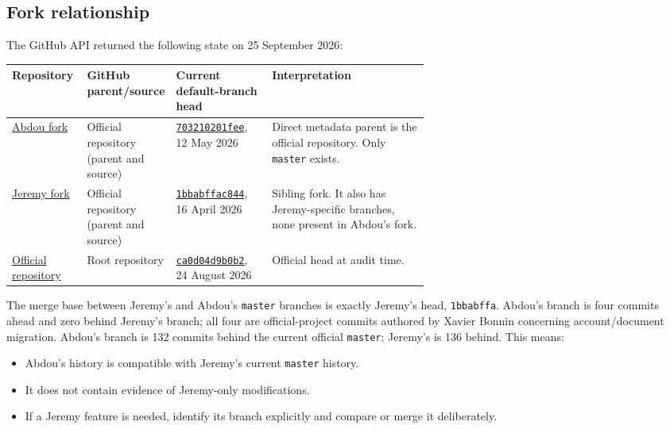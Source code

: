 \documentclass[11pt]{article}
\begin{document}
\subsection{Fork relationship}

The GitHub API returned the following state on 25 September 2026:

\small
\begin{tabularx}{\linewidth}{@{}p{0.18\linewidth}p{0.20\linewidth}p{0.23\linewidth}Y@{}}
\toprule
Repository & GitHub parent/source & Current default-branch head & Interpretation \\
\midrule
\href{https://github.com/abdoudiaw/SOLPS-ITER}{Abdou fork} & Official repository (parent and source) & \href{https://github.com/abdoudiaw/SOLPS-ITER/commit/703210201feed52981aa26251a3d9562c7a014dd}{\texttt{703210201fee}}, 12 May 2026 & Direct metadata parent is the official repository. Only \texttt{master} exists. \\
\href{https://github.com/jlore/SOLPS-ITER}{Jeremy fork} & Official repository (parent and source) & \href{https://github.com/jlore/SOLPS-ITER/commit/1bbabffac844f8a25c0749eb2526759e5418bace}{\texttt{1bbabffac844}}, 16 April 2026 & Sibling fork. It also has Jeremy-specific branches, none present in Abdou's fork. \\
\href{https://github.com/iterorganization/SOLPS-ITER}{Official repository} & Root repository & \href{https://github.com/iterorganization/SOLPS-ITER/commit/ca0d04d9b0b2d4887bd3262e4e867d471ba86d62}{\texttt{ca0d04d9b0b2}}, 24 August 2026 & Official head at audit time. \\
\bottomrule
\end{tabularx}
\normalsize

The merge base between Jeremy's and Abdou's \texttt{master} branches is exactly Jeremy's head, \texttt{1bbabffa}. Abdou's branch is four commits ahead and zero behind Jeremy's branch; all four are official-project commits authored by Xavier Bonnin concerning account/document migration. Abdou's branch is 132 commits behind the current official \texttt{master}; Jeremy's is 136 behind. This means:

\begin{itemize}
\item Abdou's history is compatible with Jeremy's current \texttt{master} history.
\item It does not contain evidence of Jeremy-only modifications.
\item If a Jeremy feature is needed, identify its branch explicitly and compare or merge it deliberately.
\end{itemize}
\end{document}
